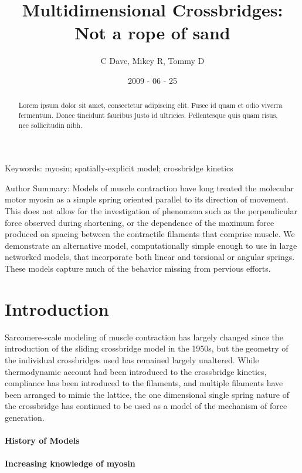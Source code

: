 \documentclass[]{article}
\title{Multidimensional Crossbridges: Not a rope of sand}
\author{C Dave, Mikey R, Tommy D}
\date{2009 - 06 - 25}
\begin{document}
\maketitle

 
\begin{abstract}
	Lorem ipsum dolor sit amet, consectetur adipiscing elit. Fusce id quam et odio viverra fermentum. Donec tincidunt faucibus justo id ultricies. Pellentesque quis quam risus, nec sollicitudin nibh. 
\end{abstract}

Keywords: myosin; spatially-explicit model; crossbridge kinetics

Author Summary: 
Models of muscle contraction have long treated the molecular motor myosin as a simple spring oriented parallel to its direction of movement. 
This does not allow for the investigation of phenomena such as the perpendicular force observed during shortening, or the dependence of the maximum force produced on spacing between the contractile filaments that comprise muscle.
We demonstrate an alternative model, computationally simple enough to use in large networked models, that incorporate both linear and torsional or angular springs. These models capture much of the behavior missing from pervious efforts.

\section*{Introduction} %

Sarcomere-scale modeling of muscle contraction has largely changed since the introduction of the sliding crossbridge model in the 1950s, but the geometry of the individual crossbridges used has remained largely unaltered. 
While thermodynamic account had been introduced to the crossbridge kinetics, compliance has been introduced to the filaments, and multiple filaments have been arranged to mimic the lattice, the one dimensional single spring nature of the crossbridge has continued to be used as a model of the mechanism of force generation.

\paragraph*{History of Models}

\paragraph*{Increasing knowledge of myosin}
\end{document}
